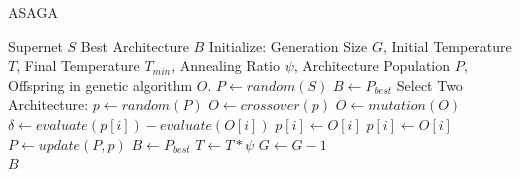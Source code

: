 \documentclass[a4paper,14pt]{extarticle}
\begin{document}
                \begin{algorithm}
                    \caption{
                        {\fontsize{12pt}{10pt}\selectfont
                            ASAGA
                        }
                        \label{alg:ASAGA}
                    }
                    {\fontsize{14pt}{12pt}\selectfont
                        \begin{algorithmic}[1]
                            \Require Supernet $S$
                            \Ensure Best Architecture $B$
                            \State Initialize: Generation Size $G$, Initial Temperature $T$,
                            Final Temperature $T_{min}$, Annealing Ratio $\psi$, Architecture Population $P$,
                            Offspring in genetic algorithm $O$.
                            \State $P \gets random(S)$
                            \State $B \gets P_{best}$
                                    \State Select Two Architecture: $p \gets random(P)$
                                    \State $O \gets crossover(p)$
                                    \State $O \gets mutation(O)$
                                        \State $\delta \gets evaluate(p[i]) - evaluate(O[i])$
                                            \State $p[i] \gets O[i]$
                                            \State $p[i] \gets O[i]$
                                        \EndIf
                                    \EndFor
                                \State $P \gets update(P, p)$
                                \EndFor
                                \State $B \gets P_{best}$
                            \EndIf
                            \State $T \gets T*\psi$
                            \State $G \gets G - 1$
                            \EndWhile \\
                            \Return $B$
                        \end{algorithmic}
                    }
                \end{algorithm}
\end{document}

